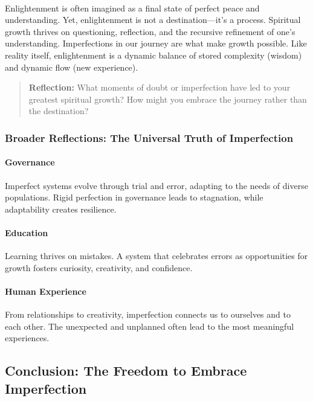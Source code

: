 \documentclass[12pt]{article}
\begin{document}
\paragraph{}
Enlightenment is often imagined as a final state of perfect peace and understanding. Yet, enlightenment is not a destination—it’s a process. Spiritual growth thrives on questioning, reflection, and the recursive refinement of one’s understanding. Imperfections in our journey are what make growth possible. Like reality itself, enlightenment is a dynamic balance of stored complexity (wisdom) and dynamic flow (new experience).

\begin{quote}
\textbf{Reflection:}  
What moments of doubt or imperfection have led to your greatest spiritual growth? How might you embrace the journey rather than the destination?
\end{quote}

\subsubsection{Broader Reflections: The Universal Truth of Imperfection}

\paragraph{Governance} Imperfect systems evolve through trial and error, adapting to the needs of diverse populations. Rigid perfection in governance leads to stagnation, while adaptability creates resilience.

\paragraph{Education} Learning thrives on mistakes. A system that celebrates errors as opportunities for growth fosters curiosity, creativity, and confidence.

\paragraph{Human Experience} From relationships to creativity, imperfection connects us to ourselves and to each other. The unexpected and unplanned often lead to the most meaningful experiences.

\subsection{Conclusion: The Freedom to Embrace Imperfection}
\end{document}
